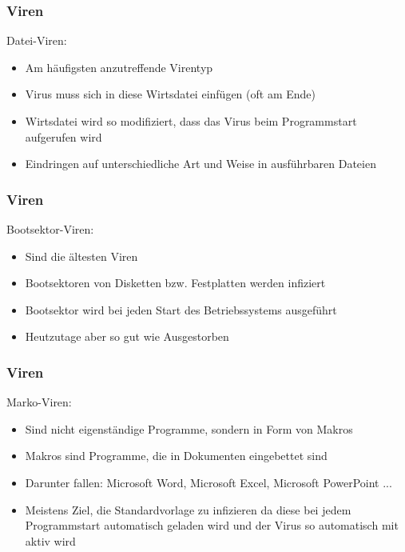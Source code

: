 \documentclass{beamer}
\begin{document}
\begin{frame}
	\frametitle{Viren}
		\begin{block}{Datei-Viren:}
			\begin{itemize}
				\item Am häufigsten anzutreffende Virentyp
				\item Virus muss sich in diese Wirtsdatei einfügen (oft am Ende)
				\item Wirtsdatei wird so modifiziert, dass das Virus beim Programmstart aufgerufen wird
				\item Eindringen auf unterschiedliche Art und Weise in ausführbaren Dateien
			\end{itemize}
		\end{block}
\end{frame}

\begin{frame}
	\frametitle{Viren}
		\begin{block}{Bootsektor-Viren:}
			\begin{itemize}
				\item Sind die ältesten Viren
				\item Bootsektoren von Disketten bzw. Festplatten werden infiziert
				\item Bootsektor wird bei jeden Start des Betriebssystems ausgeführt
				\item Heutzutage aber so gut wie Ausgestorben
			\end{itemize}
		\end{block}
\end{frame}

\begin{frame}
	\frametitle{Viren}
		\begin{block}{Marko-Viren:}
			\begin{itemize}
				\item Sind nicht eigenständige Programme, sondern in Form von Makros
				\item Makros sind Programme, die in Dokumenten eingebettet sind
				\item Darunter fallen: Microsoft Word, Microsoft Excel, Microsoft PowerPoint ...
				\item Meistens Ziel, die Standardvorlage zu infizieren da diese bei jedem Programmstart automatisch geladen wird und der Virus so automatisch mit aktiv wird
			\end{itemize}
		\end{block}
\end{frame}
\end{document}
